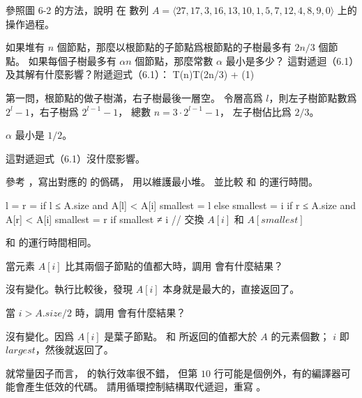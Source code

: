 \startsection[
  title={Maintaining the heap property},
]

\startEXERCISE
參照圖 6-2 的方法，說明  在
數列 $A = \langle 27, 17, 3, 16, 13, 10, 1, 5, 7, 12, 4, 8, 9, 0\rangle$ 上的操作過程。
\stopEXERCISE

\startANSWER
\startcombination[2*2]
{\externalfigure[output/e6_2_1-1]}{}
{\externalfigure[output/e6_2_1-2]}{}
{\externalfigure[output/e6_2_1-3]}{}
{}{}
\stopcombination
\stopANSWER

\startEXERCISE
如果堆有 $n$ 個節點，那麼以根節點的子節點爲根節點的子樹最多有 $2n/3$ 個節點。
如果每個子樹最多有 $\alpha n$ 個節點，那麼常數 $\alpha$ 最小是多少？
這對遞迴（6.1）及其解有什麼影響？附遞迴式（6.1）：
\startformula
T(n)\le T(2n/3) + \Theta(1)
\stopformula
\stopEXERCISE

\startANSWER
第一問，根節點的做子樹滿，右子樹最後一層空。
令層高爲 $l$，則左子樹節點數爲 $2^l - 1$，右子樹爲 $2^{l-1} - 1$，
總數 $n=3 \cdot 2^{l-1} - 1$，
左子樹佔比爲 $2/3$。

$\alpha$ 最小是 $1/2$。

這對遞迴式（6.1）沒什麼影響。
\stopANSWER

\startEXERCISE
參考 ，寫出對應的  的僞碼，
用以維護最小堆。
並比較  和  的運行時間。
\stopEXERCISE

\startANSWER
{}
\startCLRSCODE
l = 
r = 
if l ≤ A.size and A[l] < A[i]
	smallest = l
else
	smallest = i
if r ≤ A.size and A[r] < A[i]
	smallest = r
if smallest ≠ i
	// 交換 $A[i]$ 和 $A[smallest]$
\stopCLRSCODE

 和  的運行時間相同。
\stopANSWER

\startEXERCISE
當元素 $A[i]$ 比其兩個子節點的值都大時，調用  會有什麼結果？
\stopEXERCISE

\startANSWER
沒有變化。執行比較後，發現 $A[i]$ 本身就是最大的，直接返回了。
\stopANSWER

\startEXERCISE
當 $i > A.size / 2$ 時，調用  會有什麼結果？
\stopEXERCISE

\startANSWER
沒有變化。因爲 $A[i]$ 是葉子節點。  和  所返回的值都大於 $A$ 的元素個數；
 $i$ 即 $largest$，然後就返回了。
\stopANSWER

\startEXERCISE
就常量因子而言，  的執行效率很不錯，
但第 $10$ 行可能是個例外，有的編譯器可能會產生低效的代碼。
請用循環控制結構取代遞迴，重寫 。
\stopEXERCISE

